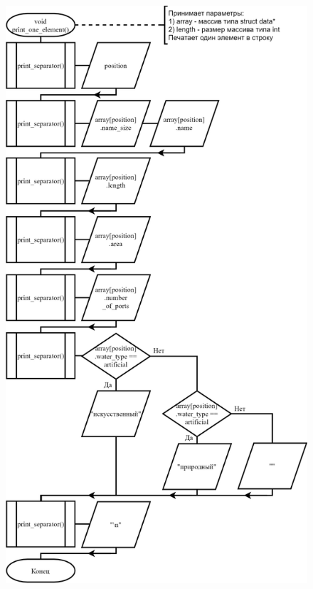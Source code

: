 \begin{figure}[!htp]
    \includegraphics[height=25cm]{../src/menu/view_all_elements/view_all_elements-2.png}
\end{figure}

